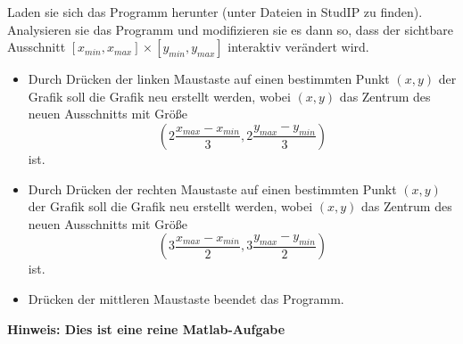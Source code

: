 \begin{aufg}[0]
Laden sie sich das Programm  herunter (unter Dateien in StudIP zu finden). 
Analysieren sie das Programm und modifizieren sie es dann so, 
dass der sichtbare Ausschnitt $[x_{min},x_{max}]\times [y_{min},y_{max}]$
interaktiv verändert wird. 
\begin{itemize}
\item Durch Drücken der
linken Maustaste auf einen bestimmten Punkt $(x,y)$ der Grafik soll  die Grafik neu
erstellt werden, wobei $(x,y)$ das Zentrum des neuen Ausschnitts mit
Gr\"o{\ss}e 
\[ \left (  2\frac{x_{max}-x_{min}}{3},  2\frac{y_{max}-y_{min}}{3} \right)\]
ist.
\item Durch Drücken der
rechten Maustaste auf einen bestimmten Punkt $(x,y)$ der Grafik soll  die Grafik neu
erstellt werden, wobei $(x,y)$ das Zentrum des neuen Ausschnitts mit
Gr\"o{\ss}e 
\[ \left (  3\frac{x_{max}-x_{min}}{2},  3\frac{y_{max}-y_{min}}{2} \right)\]
ist.
\item Drücken der mittleren Maustaste beendet das Programm. 
\end{itemize} 
\textbf{Hinweis: Dies ist eine reine Matlab-Aufgabe}
\end{aufg}
